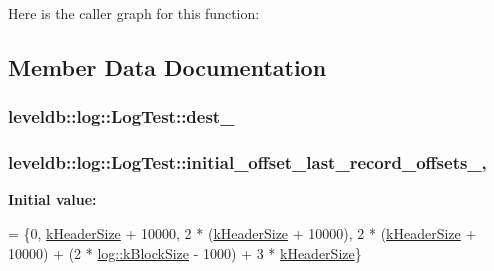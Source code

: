 Here is the caller graph for this function\-:




\subsection{Member Data Documentation}
\hypertarget{classleveldb_1_1log_1_1_log_test_a411c42600e9ef78eb22577dcce8ffb70}{
\subsubsection[{dest\-\_\-}]{ leveldb\-::log\-::\-Log\-Test\-::dest\-\_\-\hspace{0.3cm}{\ttfamily [private]}}}\label{classleveldb_1_1log_1_1_log_test_a411c42600e9ef78eb22577dcce8ffb70}
\hypertarget{classleveldb_1_1log_1_1_log_test_a291ccfe6639347ff67b6039974151b0d}{
\subsubsection[{initial\-\_\-offset\-\_\-last\-\_\-record\-\_\-offsets\-\_\-}]{ leveldb\-::log\-::\-Log\-Test\-::initial\-\_\-offset\-\_\-last\-\_\-record\-\_\-offsets\-\_\-\hspace{0.3cm}{\ttfamily [static]}, {\ttfamily [private]}}}\label{classleveldb_1_1log_1_1_log_test_a291ccfe6639347ff67b6039974151b0d}
{\bfseries Initial value\-:}
\begin{DoxyCode}
=
    \{0,
     \hyperlink{namespaceleveldb_1_1log_a3771f9a7e5d0e9057d33fbfd371f7e83}{kHeaderSize} + 10000,
     2 * (\hyperlink{namespaceleveldb_1_1log_a3771f9a7e5d0e9057d33fbfd371f7e83}{kHeaderSize} + 10000),
     2 * (\hyperlink{namespaceleveldb_1_1log_a3771f9a7e5d0e9057d33fbfd371f7e83}{kHeaderSize} + 10000) +
         (2 * \hyperlink{namespaceleveldb_1_1log_a2daa4274b5fc09292a7d856072f379b2}{log::kBlockSize} - 1000) + 3 * \hyperlink{namespaceleveldb_1_1log_a3771f9a7e5d0e9057d33fbfd371f7e83}{kHeaderSize}\}
\end{DoxyCode}
